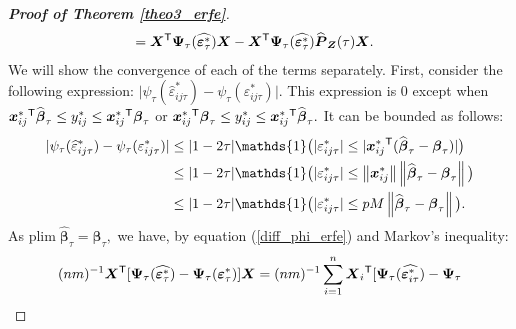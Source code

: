 \documentclass[15pt,a4paper]{article}
\newcommand{\norm}[1]{\left\lVert#1\right\rVert}
\newcommand{\transpose}{{}^{\text{\sffamily T}}}
\begin{document}
\begin{proof}[\textbf{Proof of Theorem \ref{theo3_erfe}}]
\begin{equation}
\begin{split}
    &=\boldsymbol{X}\transpose\boldsymbol{\Psi}_{\tau}(\widehat{\boldsymbol{\varepsilon}_{\tau}^{*}})\boldsymbol{X} - \boldsymbol{X}\transpose\boldsymbol{\Psi}_{\tau}(\widehat{\boldsymbol{\varepsilon}_{\tau}^{*}})\widehat{\boldsymbol{P}}_{\boldsymbol{Z}}(\tau)\boldsymbol{X}.
\end{split}
\end{equation}
We will show the convergence of each of the terms separately. First, consider the following expression: $\lvert\psi_{\tau}(\widehat{\varepsilon}^{*}_{ij\tau})-\psi_{\tau}(\varepsilon^{*}_{ij\tau})\rvert.$ This expression is 0 except when $\boldsymbol{x}_{ij}^{*}\transpose\widehat{\boldsymbol{\beta}}_{\tau} \leq y_{ij}^{*} \leq \boldsymbol{x}_{ij}^{*}\transpose\boldsymbol{\beta}_{\tau}$ or $\boldsymbol{x}_{ij}^{*}\transpose \boldsymbol{\beta}_{\tau} \leq y_{ij}^{*} \leq \boldsymbol{x}_{ij}^{*}\transpose\widehat{\boldsymbol{\beta}}_{\tau}.$ It can be bounded as follows:
\begin{equation}\label{diff_phi_erfe}
    \begin{split}
        \lvert\psi_{\tau}(\widehat{\varepsilon}^{*}_{ij\tau})-\psi_{\tau}(\varepsilon^{*}_{ij\tau})\rvert 
        &\leq \lvert 1- 2\tau \rvert \mathds{1}\big(\lvert \varepsilon^{*}_{ij\tau}
            \rvert\leq\lvert\boldsymbol{x}_{ij}^{*}\transpose(\widehat{\boldsymbol{\beta}}_{\tau}-\boldsymbol{\beta}_{\tau})\rvert\big) \\ 
        &\leq \lvert 1- 2\tau \rvert \mathds{1}\big(\lvert \varepsilon^{*}_{ij\tau} 
            \rvert\leq \norm{\boldsymbol{x}_{ij}^{*}}\norm{\widehat{\boldsymbol{\beta}}_{\tau}-\boldsymbol{\beta}_{\tau}}\big) \\
        &\leq \lvert 1- 2\tau \rvert \mathds{1}\big(\lvert \varepsilon^{*}_{ij\tau} 
            \rvert\leq pM\norm{\widehat{\boldsymbol{\beta}}_{\tau}-\boldsymbol{\beta}_{\tau}}\big). \\   
    \end{split}
\end{equation}
As $\text{plim} \; \widehat{\boldsymbol{\beta}}_{\tau}=\boldsymbol{\beta}_{\tau},$ we have, by equation (\ref{diff_phi_erfe}) and Markov's inequality:
\begin{equation*}
\begin{split}
    (nm)^{-1}\boldsymbol{X}\transpose[\boldsymbol{\Psi}_{\tau}(\widehat{\boldsymbol{\varepsilon}^{*}_{\tau}})-\boldsymbol{\Psi}_{\tau}(\boldsymbol{\varepsilon}^{*}_{\tau})]\boldsymbol{X} =
    (nm)^{-1}\sum_{i=1}^{n}\boldsymbol{X}_i\transpose[\boldsymbol{\Psi}_{\tau}(\widehat{\boldsymbol{\varepsilon}^{*}_{i\tau}})-\boldsymbol{\Psi}_{\tau}

\end{split}
\end{equation*}
\end{proof}
\end{document}

